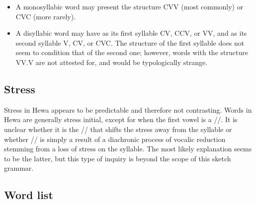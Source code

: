 \documentclass{article}
\begin{document}
\begin{itemize}

\item A monosyllabic word may present the structure CVV (most commonly) or CVC (more rarely).

\item A disyllabic word may have as its first syllable CV, CCV, or VV, and as its second syllable V, CV, or CVC. The structure of the first syllable does not seem to condition that of the second one; however, words with the structure VV.V are not attested for, and would be typologically strange.

\end{itemize}


\subsection{Stress}\label{sec:str}


Stress in Hewa appears to be predictable and therefore not contrasting. Words in Hewa are generally stress initial, except for when the first vowel is a /\textschwa/. It is unclear whether it is the /\textschwa/ that shifts the stress away from the syllable or whether /\textschwa/ is simply a result of a diachronic process of vocalic reduction stemming from a loss of stress on the syllable. The most likely explanation seems to be the latter, but this type of inquiry is beyond the scope of this sketch grammar.

\subsection*{Word list}\label{sec:wor}
\end{document}
